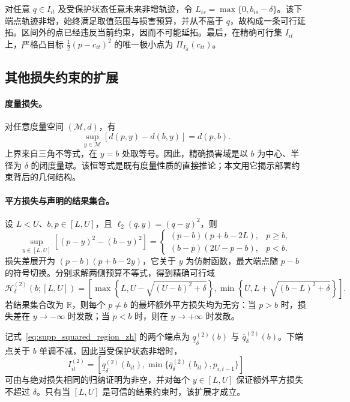 \documentclass[UTF8,11pt]{ctexart}
\begin{document}
对任意 \(q\in I_{it}\) 及受保护状态任意未来非增轨迹，令 \(L_{is}=\max\{0,b_{is}-\delta\}\)。该下端点轨迹非增，始终满足取值范围与损害预算，并从不高于 \(q\)，故构成一条可行延拓。区间外的点已经违反当前约束，因而不可能延拓。最后，在精确可行集 \(I_{it}\) 上，严格凸目标 \(\tfrac12(p-c_{it})^2\) 的唯一极小点为 \(\Pi_{I_{it}}(c_{it})\)。

\subsection{其他损失约束的扩展}

\paragraph{度量损失。}
对任意度量空间 \((\mathcal M,d)\)，有
\begin{equation}
 \sup_{y\in\mathcal M}[d(p,y)-d(b,y)]=d(p,b).
 \label{eq:supp_metric_identity_zh}
\end{equation}
上界来自三角不等式，在 \(y=b\) 处取等号。因此，精确损害域是以 \(b\) 为中心、半径为 \(\delta\) 的闭度量球。该恒等式是既有度量性质的直接推论；本文用它揭示部署约束背后的几何结构。

\paragraph{平方损失与声明的结果集合。}
设 \(L<U\)、\(b,p\in[L,U]\)，且 \(\ell_2(q,y)=(q-y)^2\)，则
\begin{equation}
 \sup_{y\in[L,U]}[(p-y)^2-(b-y)^2]
 =
 \begin{cases}
 (p-b)(p+b-2L), & p\geq b,\\
 (b-p)(2U-p-b), & p<b.
 \end{cases}
 \label{eq:supp_squared_identity_zh}
\end{equation}
损失差展开为 \((p-b)(p+b-2y)\)，它关于 \(y\) 为仿射函数，最大端点随 \(p-b\) 的符号切换。分别求解两侧预算不等式，得到精确可行域
\begin{equation}
 \mathcal H^{(2)}_\delta(b;[L,U])
 =
 \left[
 \max\!\left\{L,U-\sqrt{(U-b)^2+\delta}\right\},
 \min\!\left\{U,L+\sqrt{(b-L)^2+\delta}\right\}
 \right].
 \label{eq:supp_squared_region_zh}
\end{equation}
若结果集合改为 \(\mathbb R\)，则每个 \(p\neq b\) 的最坏额外平方损失均为无穷：当 \(p>b\) 时，损失差在 \(y\to-\infty\) 时发散；当 \(p<b\) 时，则在 \(y\to+\infty\) 时发散。

记式~\eqref{eq:supp_squared_region_zh} 的两个端点为 \(\underline q^{(2)}_\delta(b)\) 与 \(\overline q^{(2)}_\delta(b)\)。下端点关于 \(b\) 单调不减，因此当受保护状态非增时，
\[
 I^{(2)}_{it}=
 [\underline q^{(2)}_\delta(b_{it}),
 \min\{\overline q^{(2)}_\delta(b_{it}),p_{i,t-1}\}]
\]
可由与绝对损失相同的归纳证明为非空，并对每个 \(y\in[L,U]\) 保证额外平方损失不超过 \(\delta\)。只有当 \([L,U]\) 是可信的结果约束时，该扩展才成立。
\end{document}
